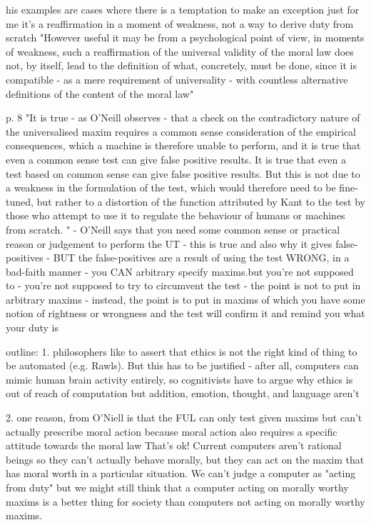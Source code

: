 his examples are cases where there is a temptation to make an exception just for me 
it's a reaffirmation in a moment of weakness, not a way to derive duty from scratch
"However useful it may be from a psychological
point of view, in moments of weakness, such a reaffirmation of the
universal validity of the moral law does not, by itself, lead to the definition
of what, concretely, must be done, since it is compatible - as a mere
requirement of universality - with countless alternative definitions of the
content of the moral law"

p. 8 "It is true - as O'Neill observes - that a check on the contradictory nature of
the universalised maxim requires a common sense consideration of the
empirical consequences, which a machine is therefore unable to perform,
and it is true that even a common sense test can give false positive results. It
is true that even a test based on common sense can give false positive
results. But this is not due to a weakness in the formulation of the test,
which would therefore need to be fine-tuned, but rather to a distortion of the
function attributed by Kant to the test by those who attempt to use it to
regulate the behaviour of humans or machines from scratch. "
- O'Neill says that you need some common sense or practical reason or judgement to perform the UT
- this is true and also why it gives false-positives
- BUT the false-positives are a result of using the test WRONG, in a bad-faith manner
- you CAN arbitrary specify maxims.but you're not supposed to
- you're not supposed to try to circumvent the test - the point is not to put in arbitrary maxims
- instead, the point is to put in maxims of which you have some notion of rightness or wrongness
and the test will confirm it and remind you what your duty is


outline:
1. philosophers like to assert that ethics is not the right kind of thing to be automated (e.g. Rawls). 
      But this has to be justified - after all, computers can mimic human brain activity entirely, so cognitivists
      have to argue why ethics is out of reach of computation but addition, emotion, thought, and language aren't

2. one reason, from O'Niell is that the FUL can only test given maxims but can't actually prescribe
moral action because moral action also requires a specific attitude towards the moral law
      That's ok! Current computers aren't rational beings so they can't actually behave morally, but
      they can act on the maxim that has moral worth in a particular situation. We can't judge a computer
      as "acting from duty" but we might still think that a computer acting on morally worthy maxims 
      is a better thing for society than computers not acting on morally worthy maxims.

